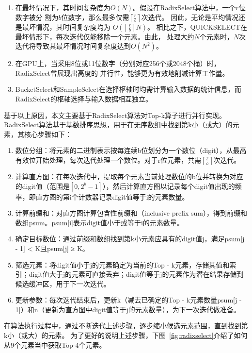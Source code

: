 \begin{enumerate}
\item 在最坏情况下，其时间复杂度为$O(N)$。假设在RadixSelect算法中，一个$r$位数字被分
割为$b$位数字，那么最多仅需$\left\lceil\frac{r}{b}\right\rceil$次迭代。
因此，无论是平均情况还是最坏情况，其时间复杂度均为
$O(\left\lceil\frac{r}{b}\right\rceil N)$。
相比之下，QUICKSELECT在最坏情形下，每次迭代仅能移除一个元素。由此，
处理大约$N$个元素时，$N$次迭代将导致其最坏情况时间复杂度达到$O(N^{2})$。

\item 在GPU上，当采用8位或11位数字（分别对应256个或2048个桶）时，RadixSelect曾展现出高度的
并行性，能够更为有效地削减计算工作量。

\item BucketSelect和SampleSelect在选择枢轴时均需计算输入数据的统计信息，而RadixSelect的枢轴选择与输入数据相互独立。

\end{enumerate}
基于以上原因，本文主要基于RadixSelect算法对Top-k算子进行并行实现。
RadixSelect算法基于基数排序思想，用于在无序数组中找到第k小（或大）的元素，其核心步骤如下：
\begin{enumerate}
    \item {数位分组}：将元素的二进制表示按每连续b位划分为一个数位（digit），从最高有效位开始处理，每次迭代处理一个数位。对于r位元素，共需$\left\lceil\frac{r}{b}\right\rceil$次迭代。
    \item  {计算直方图}：在每次迭代中，提取每个元素当前处理数位的b位并转换为对应的digit值（范围是$[0, 2^{b}-1]$），然后计算直方图以记录每个digit值出现的频率，即直方图的第i个计数器记录digit值等于i的元素数量。
    \item  {计算前缀和}：对直方图计算包含性前缀和（inclusive prefix sum），得到前缀和数组psum。psum[i]表示digit值小于或等于i的元素数量。
    \item  {确定目标数位}：通过前缀和数组找到第k小元素应具有的digit值j，满足psum[j - 1] < K且psum[j] ≥ K。
    \item  {筛选元素}：将digit值小于j的元素确定为当前的Top - k元素，存储其值和索引；digit值大于j的元素可直接丢弃；digit值等于j的元素作为潜在结果存储到候选缓冲区，用于下一次迭代。
    \item  {更新参数}：每次迭代结束后，更新k（减去已确定的Top - k元素数量psum[j - 1]）和n（更新为直方图中digit值等于j的元素数量），为下一次迭代做准备。
\end{enumerate}
在算法执行过程中，通过不断迭代上述步骤，逐步缩小候选元素范围，直到找到第k小（或大）的元素。
为了更好的说明上述步骤，下图~\ref{fig:radixselect}介绍了如何从9个元素当中获取Top-4个元素。

